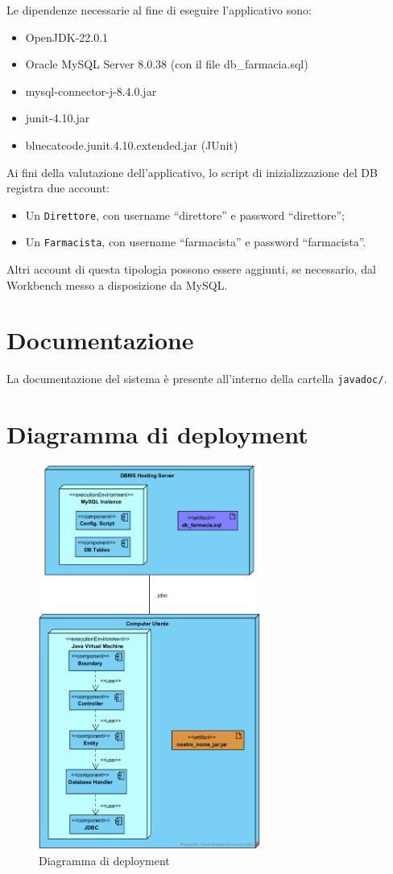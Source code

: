 Le dipendenze necessarie al fine di eseguire l'applicativo sono:
\begin{itemize}
	\item OpenJDK-22.0.1
	\item Oracle MySQL Server 8.0.38 (con il file db\_farmacia.sql)
	\item mysql-connector-j-8.4.0.jar
	\item junit-4.10.jar
	\item bluecatcode.junit.4.10.extended.jar (JUnit)
\end{itemize}

\noindent Ai fini della valutazione dell'applicativo, lo script di inizializzazione del DB registra due account:
\begin{itemize}
	\item Un \texttt{Direttore}, con username ``direttore'' e password ``direttore'';
	\item Un \texttt{Farmacista}, con username ``farmacista'' e password ``farmacista''.
\end{itemize}

\noindent Altri account di questa tipologia possono essere aggiunti, se necessario, dal Workbench messo a disposizione da MySQL.

\section{Documentazione}

La documentazione del sistema è presente all'interno della cartella \texttt{javadoc/}.

\vfill
\pagebreak

\section{Diagramma di deployment}

\begin{figure}[h]
	\centering
	\includegraphics[width=0.65\textwidth]{assets/DeploymentFarmacia.png}
	\caption{Diagramma di deployment}
	\label{diag:deployment}
\end{figure}

